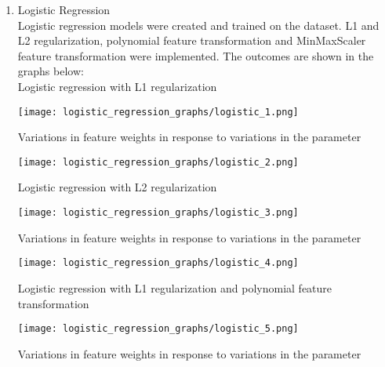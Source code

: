 \documentclass[12pt]{article}
\begin{document}
	
	\begin{enumerate}
		\item Logistic Regression\\
		
		Logistic regression models were created and trained on the dataset. L1 and L2 regularization, polynomial feature transformation and MinMaxScaler feature transformation were implemented. The outcomes are shown in the graphs below:\\
		
		Logistic regression with L1 regularization\\
		
		\begin{center}
			\texttt{[image: logistic\_regression\_graphs/logistic\_1.png]}
		\end{center}
		
		Variations in feature weights in response to variations in the parameter\\
		
		\begin{center}
			\texttt{[image: logistic\_regression\_graphs/logistic\_2.png]}
		\end{center}
		
		Logistic regression with L2 regularization\\
		
		\begin{center}
			\texttt{[image: logistic\_regression\_graphs/logistic\_3.png]}
		\end{center}
		
		Variations in feature weights in response to variations in the parameter\\
		
		\begin{center}
			\texttt{[image: logistic\_regression\_graphs/logistic\_4.png]}
		\end{center}
		
		Logistic regression with L1 regularization and polynomial feature transformation\\
		
		\begin{center}
			\texttt{[image: logistic\_regression\_graphs/logistic\_5.png]}
		\end{center}
		
		Variations in feature weights in response to variations in the parameter\\
		

\end{enumerate}
\end{document}
